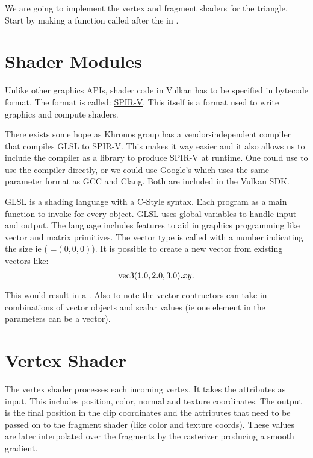 \par We are going to implement the vertex and fragment shaders for the triangle. Start by making a  function called after the  in .

\section*{Shader Modules}

\par Unlike other graphics APIs, shader code in Vulkan has to be specified in bytecode format. The format is called: \href{https://www.khronos.org/spirv/}{SPIR-V}. This itself is a format used to write graphics and compute shaders.

\par There exists some hope as Khronos group has a vendor-independent compiler that compiles GLSL to SPIR-V. This makes it way easier and it also allows us to include the compiler as a library to produce SPIR-V at runtime. One could use  to use the compiler directly, or we could use Google's  which uses the same parameter format as GCC and Clang. Both are included in the Vulkan SDK. 

\par GLSL is a shading language with a C-Style syntax. Each program as a main function to invoke for every object. GLSL uses global variables to handle input and output. The language includes features to aid in graphics programming like vector and matrix primitives. The vector type is called  with a number indicating the size ie ( =$(0,0,0)$). It is possible to create a new vector from existing vectors like:
 \[
     \inlinecode{vec3}(1.0,2.0,3.0).xy
.\] 
\par This would result in a . Also to note the vector contructors can take in combinations of vector objects and scalar values (ie one element in the parameters can be a vector). 

\section*{Vertex Shader}

\par The vertex shader processes each incoming vertex. It takes the attributes as input. This includes position, color, normal and texture coordinates. The output is the final position in the clip coordinates and the attributes that need to be passed on to the fragment shader (like color and texture coords). These values are later interpolated over the fragments by the rasterizer producing a smooth gradient.

